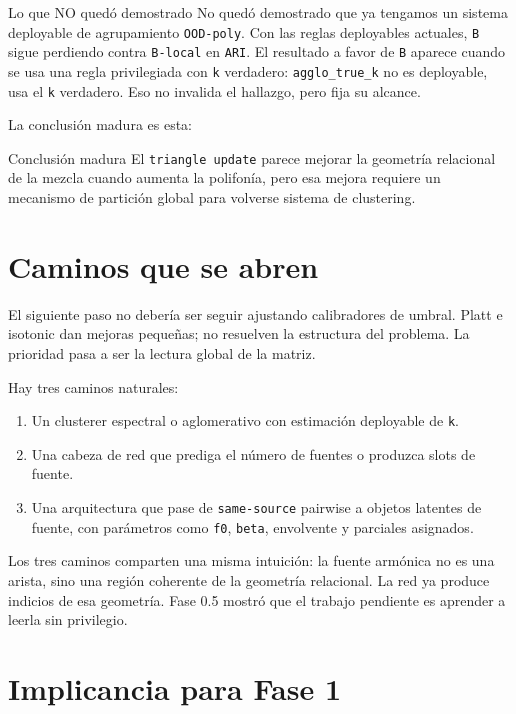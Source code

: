 \documentclass[11pt]{article}
\begin{document}
\begin{alertbox}{Lo que NO quedó demostrado}
No quedó demostrado que ya tengamos un sistema deployable de agrupamiento \texttt{OOD-poly}. Con las reglas deployables actuales, \texttt{B} sigue perdiendo contra \texttt{B-local} en \texttt{ARI}. El resultado a favor de \texttt{B} aparece cuando se usa una regla privilegiada con \texttt{k} verdadero: \texttt{agglo\_true\_k} no es deployable, usa el \texttt{k} verdadero. Eso no invalida el hallazgo, pero fija su alcance.
\end{alertbox}

La conclusión madura es esta:

\pagebreak

\begin{keybox}{Conclusión madura}
El \texttt{triangle update} parece mejorar la geometría relacional de la mezcla cuando aumenta la polifonía, pero esa mejora requiere un mecanismo de partición global para volverse sistema de clustering.
\end{keybox}

\section{Caminos que se abren}

El siguiente paso no debería ser seguir ajustando calibradores de umbral. Platt e isotonic dan mejoras pequeñas; no resuelven la estructura del problema. La prioridad pasa a ser la lectura global de la matriz.

Hay tres caminos naturales:

\begin{enumerate}
  \item Un clusterer espectral o aglomerativo con estimación deployable de \texttt{k}.
  \item Una cabeza de red que prediga el número de fuentes o produzca slots de fuente.
  \item Una arquitectura que pase de \texttt{same-source} pairwise a objetos latentes de fuente, con parámetros como \texttt{f0}, \texttt{beta}, envolvente y parciales asignados.
\end{enumerate}

Los tres caminos comparten una misma intuición: la fuente armónica no es una arista, sino una región coherente de la geometría relacional. La red ya produce indicios de esa geometría. Fase 0.5 mostró que el trabajo pendiente es aprender a leerla sin privilegio.

\section{Implicancia para Fase 1}
\end{document}
